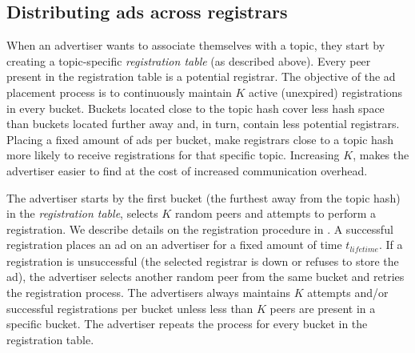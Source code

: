 
\subsection{Distributing ads across registrars}\label{sec:registration_multi}
When an advertiser wants to associate themselves with a topic, they start by creating a topic-specific \emph{registration table} (as described above). 
Every peer present in the registration table is a potential registrar. 
The objective of the ad placement process is to continuously maintain $K$ active (\ie unexpired) registrations in every bucket. 
Buckets located close to the topic hash cover less hash space than buckets located further away and, in turn, contain less potential registrars. 
Placing a fixed amount of ads per bucket, make registrars close to a topic hash more likely to receive registrations for that specific topic. 
Increasing $K$, makes the advertiser easier to find at the cost of increased communication overhead. 

The advertiser starts by the first bucket (the furthest away from the topic hash) in the \emph{registration table}, selects $K$ random peers and attempts to perform a registration. 
We describe details on the registration procedure in . 
A successful registration places an ad on an advertiser for a fixed amount of time $t_\textit{lifetime}$.
If a registration is unsuccessful (the selected registrar is down or refuses to store the ad), the advertiser selects another random peer from the same bucket and retries the registration process. 
The advertisers always maintains $K$ attempts and/or successful registrations per bucket unless less than $K$ peers are present in a specific bucket. 
The advertiser repeats the process for every bucket in the registration table. 


